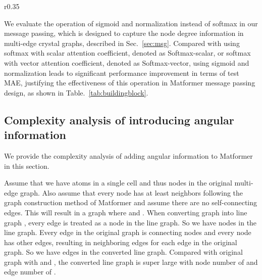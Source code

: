 \documentclass{article}
\begin{document}
\begin{wraptable}[7]{r}{0.35\textwidth}
\vspace{-20 pt}
\begin{center}
\caption{Operation ablation study.}
\vspace{-5pt}
\label{tab:buildingblock}
\end{center}
\end{wraptable}
We evaluate the operation of sigmoid and normalization instead of softmax in our message passing, which is designed to capture the node degree information in multi-edge crystal graphs, described in Sec.~\ref{sec:msg}. Compared with using softmax with scalar attention coefficient, denoted as Softmax-scalar, or softmax with vector attention coefficient, denoted as Softmax-vector, using sigmoid and normalization leads to significant performance improvement in terms of test MAE, justifying the effectiveness of this operation in Matformer message passing design, as shown in Table.~\ref{tab:buildingblock}.



\subsection{Complexity analysis of introducing angular information}
\label{app:time_angle}
We provide the complexity analysis of adding angular information to Matformer in this section.

Assume that we have  atoms in a single cell and thus  nodes in the original multi-edge graph. Also assume that every node has at least  neighbors following the graph construction method of Matformer and assume there are no self-connecting edges. This will result in a graph  where  and . When converting graph  into line graph , every edge is treated as a node in the line graph. So we have  nodes in the line graph. Every edge in the original graph is connecting  nodes and every node has  other edges, resulting in  neighboring edges for each edge in the original graph. So we have  edges in the converted line graph. Compared with original graph with  and , the converted line graph is super large with node number of  and edge number of .
\end{document}
